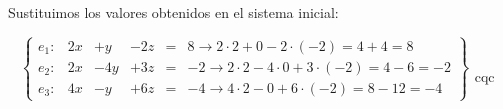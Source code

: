 \documentclass[palatino,nosec]{Docencia}
\begin{document}
\begin{problem}
Sustituimos los valores obtenidos en el sistema inicial:

\[
\left\{\begin{array}{lccccl}
e_1: &	2x &	+	y &		- 2z &	= & 8 \to 2·2 + 0 - 2·(-2) = 4+4 = 8\\
e_2: &	2x &	-	4y &	+ 3z &	= & -2 \to 2·2 - 4·0 + 3·(-2) = 4-6 = -2\\
e_3: &	4x &	-	y &		+ 6z &	= & -4 \to 4·2 - 0 + 6·(-2) = 8-12 = -4
\end{array}\right\}\begin{array}{c}\\\\\\\\\text{cqc}\end{array}
\]

\end{problem}
\end{document}

